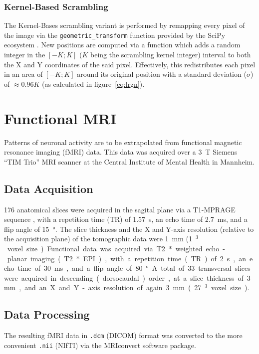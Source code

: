 	    \subsubsection{Kernel-Based Scrambling}\label{sec:m_vs_si_ks}
		The Kernel-Bases scrambling variant is performed by remapping every pixel of the image via the \colorbox{vlg}{\texttt{geometric\_transform}} function provided by the SciPy ecosystem \citep{scipy,Oliphant2007}.
		New positions are computed via a function which adds a random integer in the $[-K;K]$ ($K$ being the scrambling kernel integer) interval to both the X and Y coordinates of the said pixel.
		Effectively, this redistributes each pixel in an area of $[-K;K]$ around its original position with a standard deviation ($\sigma$) of $\approx 0.96K$ (as calculated in figure~\ref{eq:lrgn}).
    \section{Functional MRI}\label{sec:m_fmri}
	Patterns of neuronal activity are to be extrapolated from functional magnetic resonance imaging (fMRI) data.
	This data was acquired over a \SI{3}{\tesla} Siemens “TIM Trio” MRI scanner at the Central Institute of Mental Health in Mannheim.
	\subsection{Data Acquisition}
	    176 anatomical slices were acquired in the sagital plane via a T1-MPRAGE sequence \citep{Brant-Zawadzki1992}, with a repetition time (TR) of \SI{1.57}{\second}, an echo time of \SI{2.7}{\milli\second}, and a flip angle of \SI{15}{\degree}.
	    The slice thickness and the X and Y-axis resolution (relative to the acquisition plane) of the tomographic data were \SI{1}{\milli\metre} (\SI{1}{\milli\metre$^3$} voxel size).
	    
	    Functional data was acquired via T2* weighted echo-planar imaging (T2* EPI), with a repetition time (TR) of \SI{2}{\second}, an echo time of \SI{30}{\milli\second}, and a flip angle of \SI{80}{\degree}.
	    A total of 33 transversal slices were acquired in descending (dorsocaudal) order, at a slice thickness of \SI{3}{\milli\metre}, and an X and Y-axis resolution of again \SI{3}{\milli\metre} (\SI{27}{\milli\metre$^3$} voxel size).
	\subsection{Data Processing}\label{sec:m_fmri_dp}
	    The resulting fMRI data in \colorbox{vlg}{\texttt{.dcm}} (DICOM) format was converted to the more convenient \colorbox{vlg}{\texttt{.nii}} (NIfTI) via the MRIconvert \citep{MRIconvert} software package.
	    

